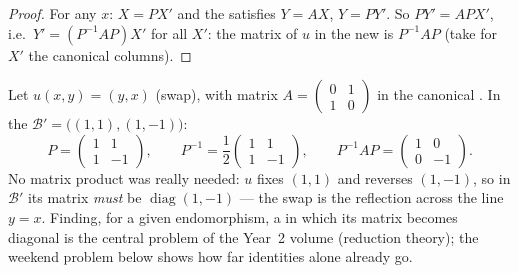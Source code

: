 \begin{proof}
For any $x$: $X = PX'$ and the  satisfies $Y = AX$, $Y = PY'$.
So $PY' = APX'$, i.e.\ $Y' = (P^{-1}AP)X'$ for all $X'$: the matrix
of $u$ in the new  is $P^{-1}AP$ (take for $X'$ the canonical
columns).
\end{proof}

\begin{example}
\label{ex:b1:matrices:conjugationrun}
Let $u(x, y) = (y, x)$ (swap), with matrix $A = \begin{pmatrix} 0
& 1\\ 1 & 0\end{pmatrix}$ in the canonical . In the 
$\mathcal B' = \bigl((1,1), (1,-1)\bigr)$:
\[
P = \begin{pmatrix} 1 & 1\\ 1 & -1 \end{pmatrix},
\qquad
P^{-1} = \frac12\begin{pmatrix} 1 & 1\\ 1 & -1 \end{pmatrix},
\qquad
P^{-1} A P = \begin{pmatrix} 1 & 0\\ 0 & -1 \end{pmatrix}.
\]
No matrix product was really needed: $u$ fixes $(1,1)$ and
reverses $(1,-1)$, so in $\mathcal B'$ its matrix \emph{must} be
$\operatorname{diag}(1, -1)$ --- the swap is the reflection
across the line $y = x$. Finding, for a given endomorphism, a
 in which its matrix becomes diagonal is the central problem
of the Year~2 volume (reduction theory); the weekend problem
below shows how far  identities alone already go.
\end{example}

